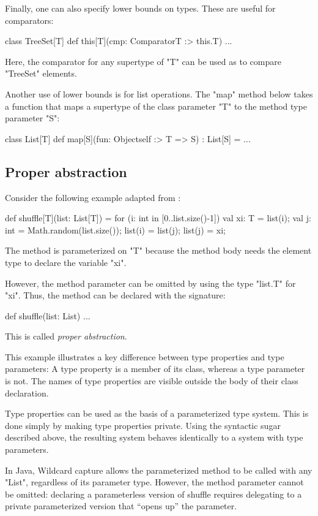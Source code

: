 \documentclass[preprint,nocopyrightspace,9pt]{sigplanconf}
\begin{document}
Finally,
one can also specify lower bounds on types.  These are useful for
comparators:
\begin{xten}
class TreeSet[T] {
    def this[T](cmp: Comparator{T :> this.T}) { ... }
}
\end{xten}
Here, the comparator for any supertype of \xcd"T" can be used as
to compare \xcd"TreeSet" elements.

Another use of lower bounds is for list operations.
The \xcd"map" method below takes a function that maps a supertype
of the class parameter \xcd"T" to the method type parameter \xcd"S":
\begin{xten}
class List[T] {
    def map[S](fun: Object{self :> T} => S) : List[S] = { ... }
}
\end{xten}

\subsection{Proper abstraction}

Consider the following example adapted from \cite{adding-wildcards}:
\begin{xten}
def shuffle[T](list: List[T]) = {
    for (i: int in [0..list.size()-1]) {
        val xi: T = list(i);
        val j: int = Math.random(list.size());
        list(i) = list(j);
        list(j) = xi;
    }
}
\end{xten}
The method is parameterized on \xcd"T" because the method body needs
the element type to declare the variable \xcd"xi".

However, the method parameter can be omitted by using the type \xcd"list.T"
for \xcd"xi".  Thus, the method can be declared with the signature:
\begin{xten}
def shuffle(list: List) { ... }
\end{xten}
This is called \emph{proper abstraction}.

This example illustrates a key difference between type properties
and type parameters:
A type property is a member of its class, whereas a type parameter is
not.  The names of type properties are visible outside the body of
their class declaration.

Type properties can be used as the basis of a parameterized type
system.  This is done simply by making type properties private.
Using the syntactic sugar described above,
the resulting system behaves identically to a system with type
parameters.
\fi

In Java,
Wildcard
capture allows the parameterized method to be called with any \xcd"List",
regardless of its parameter type.
However,
the method parameter cannot be omitted: declaring a parameterless version
of shuffle requires delegating to a private parameterized version that
``opens up'' the parameter.
\end{document}
